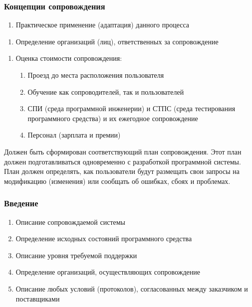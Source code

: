 \documentclass{../industrial-development}
\begin{document}
\lecturenotes

\begin{frame} \frametitle{Концепции сопровождения}
	\begin{enumerate}[2]
	\item Практическое применение (адаптация) данного процесса
	\end{enumerate}
	\begin{enumerate}[3]
	\item Определение организаций (лиц), ответственных за сопровождение
	\end{enumerate}
	\begin{enumerate}[4]
	\item Оценка стоимости сопровождения: 
		\begin{enumerate}
		\item Проезд до места расположения пользователя 
		\item Обучение как сопроводителей, так и пользователей
		\item СПИ (среда программной инженерии) и СТПС (среда тестирования программного средства) и их ежегодное сопровождение
		\item Персонал (зарплата и премии) 
		\end{enumerate}
	\end{enumerate}
\end{frame}

\lecturenotes
Должен быть сформирован соответствующий план сопровождения. Этот план должен подготавливаться одновременно с разработкой программной системы. План должен определять, как пользователи будут размещать свои запросы на модификацию (изменения) или сообщать об ошибках, сбоях и проблемах. 

\begin{frame} \frametitle{Введение}
	\begin{enumerate}
		\item Описание сопровождаемой системы
		\item Определение исходных состояний программного средства 
		\item Описание уровня требуемой поддержки
		\item Определение организаций, осуществляющих сопровождение 
		\item Описание любых условий (протоколов), согласованных между заказчиком и поставщиками 
	\end{enumerate}
\end{frame}
\end{document}
